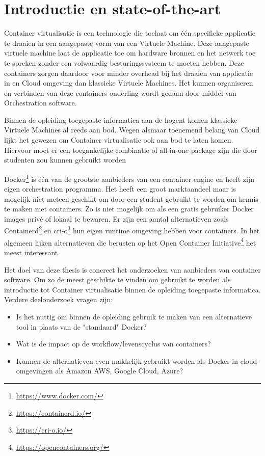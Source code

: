 
\section{Introductie en state-of-the-art} %
\label{sec:introductie}

Container virtualisatie is een technologie die toelaat om één specifieke applicatie te draaien in een aangepaste vorm van een Virtuele Machine. Deze aangepaste virtuele machine laat de applicatie toe om hardware bronnen en het netwerk toe te spreken zonder een volwaardig besturingssysteem te moeten hebben. Deze containers zorgen daardoor voor minder overhead bij het draaien van applicatie in en Cloud omgeving dan klassieke Virtuele Machines. Het kunnen organiseren en verbinden van deze containers onderling wordt gedaan door middel van Orchestration software. \autocite{eder2016hypervisor,silva2018cont,truyen2019comprehensive}

Binnen de opleiding toegepaste informatica aan de hogent komen klassieke Virtuele Machines al reeds aan bod. Wegen alsmaar toenemend belang van Cloud lijkt het gewezen om Container virtualisatie ook aan bod te laten komen. Hiervoor moet er een toegankelijke combinatie of all-in-one package zijn die door studenten zou kunnen gebruikt worden

Docker\footnote{\url{https://www.docker.com/}}  is één van de grootste aanbieders van een container engine en heeft zijn eigen orchestration programma. Het heeft een groot marktaandeel maar is mogelijk niet meteen geschikt om door een student gebruikt te worden om kennis te maken met containers. Zo is niet mogelijk om als een gratis gebruiker Docker images privé of lokaal te bewaren. Er zijn een aantal alternatieven zoals Containerd\footnote{\url{https://containerd.io/}} en cri-o\footnote{\url{https://cri-o.io/}} hun eigen runtime omgeving hebben voor containers. In het algemeen lijken  alternatieven die berusten op het Open Container Initiative\footnote{\url{https://opencontainers.org/}} het meest interessant.
 
Het doel van deze thesis is concreet het onderzoeken van aanbieders van container software. Om zo de meest geschikte te vinden om gebruikt te worden als introductie tot Container virtualisatie binnen de opleiding toegepaste informatica. Verdere deelonderzoek vragen zijn:
\begin{itemize}
    \item Is het nuttig om binnen de opleiding gebruik te maken van een alternatieve tool  in plaats van de "standaard" Docker?
    \item Wat is de impact op de workflow/levenscyclus van containers?
    \item Kunnen de alternatieven even makkelijk gebruikt worden als Docker in cloud-omgevingen als Amazon AWS, Google Cloud, Azure?
\end{itemize}

